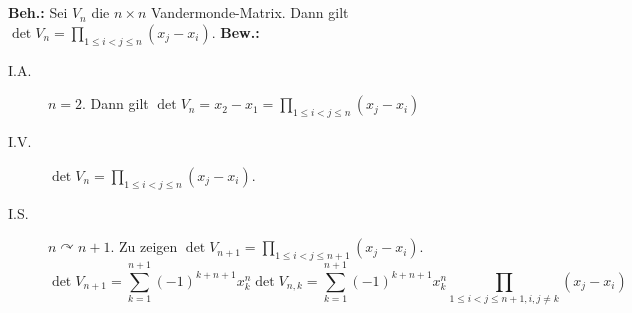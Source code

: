 \documentclass[sectionformat = aufgabe]{gadsescript}
\begin{document}
\maketitle
\setcounter{section}{9}
\subsection{}
\textbf{Beh.:} Sei $ V_n $ die $ n \times n $ Vandermonde-Matrix. Dann gilt $ \det V_n = \prod_{1 \leq i < j \leq n}^{} (x_j - x_i)  $.
\textbf{Bew.:}
\begin{description}
	\item[I.A.] $ n = 2 $. Dann gilt $ \det V_n = x_2 - x_1 = \prod_{1 \leq i < j \leq n}^{} (x_j - x_i)  $
	\item[I.V.] $ \det V_{n} = \prod_{1 \leq i < j \leq n}^{} (x_j - x_i)  $.
	\item[I.S.] $ n \curvearrowright n + 1 $. Zu zeigen $ \det V_{n + 1} = \prod_{1 \leq i < j \leq n + 1}^{} (x_j - x_i)  $.
		\[
			\det V_{n + 1} = \sum_{k=1}^{n + 1} (-1)^{k + n + 1} x_k^{n} \det V_{n, k} = \sum_{k=1}^{n + 1} (-1)^{k + n + 1} x_k^n \prod_{1 \leq i < j \leq n + 1, i, j \neq k}^{}  (x_j - x_i)
		\]
\end{description}
\end{document}

